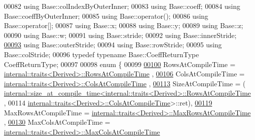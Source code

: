 \begin{DoxyCode}
00082     \textcolor{keyword}{using} Base::colIndexByOuterInner;
00083     \textcolor{keyword}{using} Base::coeff;
00084     \textcolor{keyword}{using} Base::coeffByOuterInner;
00085     \textcolor{keyword}{using} Base::operator();
00086     \textcolor{keyword}{using} Base::operator[];
00087     \textcolor{keyword}{using} Base::x;
00088     \textcolor{keyword}{using} Base::y;
00089     \textcolor{keyword}{using} Base::z;
00090     \textcolor{keyword}{using} Base::w;
00091     \textcolor{keyword}{using} Base::stride;
00092     \textcolor{keyword}{using} Base::innerStride;
\hyperlink{group___core___module_a5ef049952634d83e1c18bcda3a3e980c}{00093}     \textcolor{keyword}{using} Base::outerStride;
00094     \textcolor{keyword}{using} Base::rowStride;
00095     \textcolor{keyword}{using} Base::colStride;
00096     \textcolor{keyword}{typedef} \textcolor{keyword}{typename} Base::CoeffReturnType CoeffReturnType;
00097 
00098     \textcolor{keyword}{enum} \{
00099 
\hyperlink{group___core___module_acbe29cde3b49701fd0394357a96437a9}{00100}       RowsAtCompileTime = \hyperlink{struct_eigen_1_1internal_1_1traits}{internal::traits<Derived>::RowsAtCompileTime}
      ,
\hyperlink{group___core___module_a9784b8701c2d1c79fa8000e1b3ebdb8bac1b474fd08671c39df677c4acdbc8df0}{00106}       ColsAtCompileTime = \hyperlink{struct_eigen_1_1internal_1_1traits}{internal::traits<Derived>::ColsAtCompileTime}
      ,
\hyperlink{group___core___module_a9784b8701c2d1c79fa8000e1b3ebdb8ba6af0829cb5fc7506d681b5d011846d17}{00113}       SizeAtCompileTime = (
      \hyperlink{struct_eigen_1_1internal_1_1size__at__compile__time}{internal::size\_at\_compile\_time<internal::traits<Derived>::RowsAtCompileTime}
      ,
00114                                                    
      \hyperlink{struct_eigen_1_1internal_1_1traits}{internal::traits<Derived>::ColsAtCompileTime}>::ret),
\hyperlink{group___core___module_a54bec6dbd37bc39602e0b8e1177d0010}{00119}       MaxRowsAtCompileTime = \hyperlink{struct_eigen_1_1internal_1_1traits}{internal::traits<Derived>::MaxRowsAtCompileTime}
      ,
\hyperlink{group___core___module_a9784b8701c2d1c79fa8000e1b3ebdb8babb63689911f3c5b59d0a76e842994b1f}{00130}       MaxColsAtCompileTime = \hyperlink{struct_eigen_1_1internal_1_1traits}{internal::traits<Derived>::MaxColsAtCompileTime}

\end{DoxyCode}
